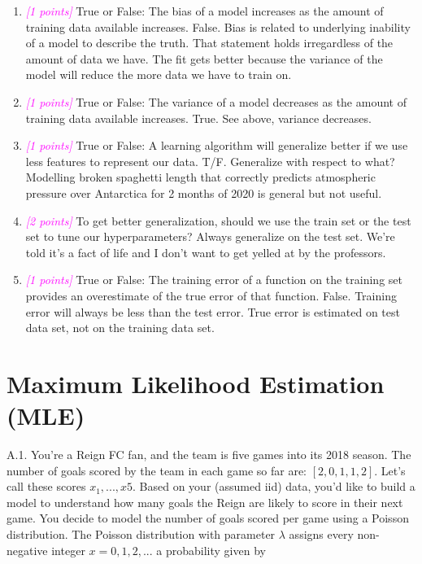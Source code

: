 \documentclass{article}
\newcommand{\1}{\mathbf{1}}
\newcommand{\points}[1]{\small\textcolor{magenta}{\emph{[#1 points]}} \normalsize}
\begin{document}
\begin{enumerate}
    \item\points{1} True or False:  The bias of a model increases as the amount of training data available increases.\newline
    False. Bias is related to underlying inability of a model to describe the truth. That statement holds irregardless of the amount of data we have. The fit gets better because the variance of the model will reduce the more data we have to train on.

    \item\points{1} True  or  False:  The  variance  of  a  model  decreases  as  the  amount  of  training  data  available increases.\newline
    True. See above, variance decreases.

    \item\points{1} True or False:  A learning algorithm will generalize better if we use less features to represent our data.\newline
    T/F. Generalize with respect to what? Modelling broken spaghetti length that correctly predicts atmospheric pressure over Antarctica for 2 months of 2020 is general but not useful. 

    \item\points{2} To get better generalization, should we use the train set or the test set to tune our hyperparameters?\newline
    Always generalize on the test set. We're told it's a fact of life and I don't want to get yelled at by the professors.

    \item\points{1} True or False:  The training error of a function on the training set provides an overestimate of the true error of that function. \newline
    False. Training error will always be less than the test error. True error is estimated on test data set, not on the training data set.
\end{enumerate}





\newpage
\section*{Maximum Likelihood Estimation (MLE)}

A.1.  You’re a Reign FC fan, and the team is five games into its 2018 season. The number of goals scored by the team in each game so far are: $[2,0,1,1,2]$. Let’s call these scores $x_1,...,x5$.  Based on your (assumed iid) data, you’d like to build a model to understand how many goals the Reign are likely to score in their next game. You decide to model the number of goals scored per game using a Poisson  distribution. The Poisson distribution with parameter $\lambda$ assigns every non-negative integer $x=0,1,2,...$ a probability given by
\end{document}

